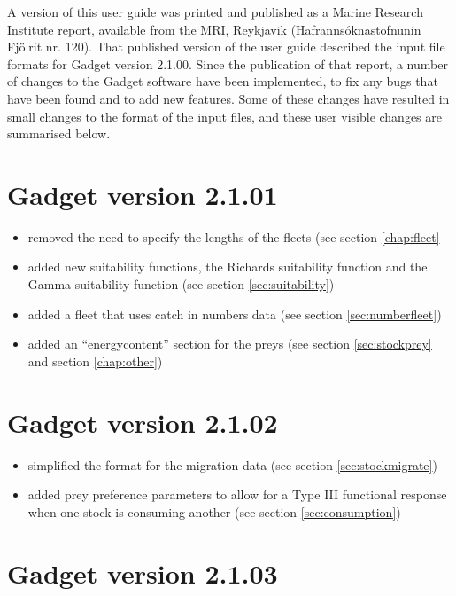 \documentclass[]{book}
\begin{document}
A version of this user guide was printed and published as a Marine
Research Institute report, available from the MRI, Reykjavik
(Hafrannsóknastofnunin Fjölrit nr. 120). That published version of the
user guide described the input file formats for Gadget version 2.1.00.
Since the publication of that report, a number of changes to the Gadget
software have been implemented, to fix any bugs that have been found and
to add new features. Some of these changes have resulted in small
changes to the format of the input files, and these user visible changes
are summarised below.

\hypertarget{sec:v2101}{%
\section{Gadget version 2.1.01}\label{sec:v2101}}

\begin{itemize}
\item
  removed the need to specify the lengths of the fleets (see
  section \ref{chap:fleet}
\item
  added new suitability functions, the Richards suitability function
  and the Gamma suitability function (see
  section \ref{sec:suitability})
\item
  added a fleet that uses catch in numbers data (see
  section \ref{sec:numberfleet})
\item
  added an ``energycontent'' section for the preys (see
  section \ref{sec:stockprey} and
  section \ref{chap:other})
\end{itemize}

\hypertarget{sec:v2102}{%
\section{Gadget version 2.1.02}\label{sec:v2102}}

\begin{itemize}
\item
  simplified the format for the migration data (see
  section \ref{sec:stockmigrate})
\item
  added prey preference parameters to allow for a Type III functional
  response when one stock is consuming another (see
  section \ref{sec:consumption})
\end{itemize}

\hypertarget{sec:v2103}{%
\section{Gadget version 2.1.03}\label{sec:v2103}}
\end{document}
